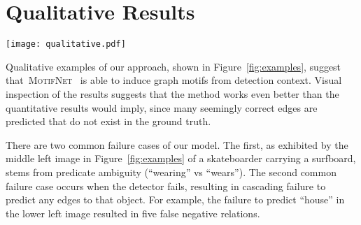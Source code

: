 \documentclass[10pt,twocolumn,letterpaper]{article}
\newcommand{\model}{\textsc{MotifNet}}
\begin{document}
\section{Qualitative Results}
\label{sec:qualitative}
\begin{figure*}[t]
    \vspace{-.3cm}
    \centering
    \texttt{[image: qualitative.pdf]}
    \caption{Qualitative examples from our model in the Scene Graph Detection setting. Green boxes are predicted and overlap with the ground truth, orange boxes are ground truth with no match. Green edges are true positives predicted by our model at the R@20 setting, orange edges are false negatives, and blue edges are false positives. Only predicted boxes that overlap with the ground truth are shown. }
    \vspace{-.4cm}
    \label{fig:examples}
\end{figure*}

Qualitative examples of our approach, shown in Figure~\ref{fig:examples}, suggest that~\model~ is able to induce graph motifs from detection context. Visual inspection of the results suggests that the method works even better than the quantitative results would imply, since many seemingly correct edges are predicted that do not exist in the ground truth.

There are two common failure cases of our model. The first, as exhibited by the middle left image in Figure~\ref{fig:examples} of a skateboarder carrying a surfboard, stems from predicate ambiguity (``wearing'' vs ``wears'').
The second common failure case occurs when the detector fails, resulting in cascading failure to predict any edges to that object.
For example, the failure to predict ``house'' in the lower left image resulted in five false negative relations.
\end{document}
